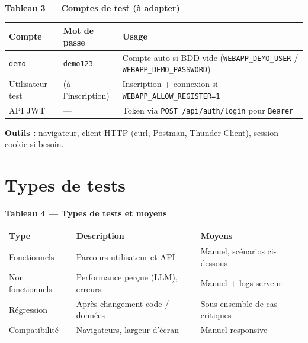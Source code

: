 \documentclass[11pt,a4paper]{article}
\begin{document}
\textbf{Tableau 3 — Comptes de test (à adapter)}

\small
\begin{longtable}{@{}p{2.2cm}p{2.2cm}p{9cm}@{}}
\toprule
\textbf{Compte} & \textbf{Mot de passe} & \textbf{Usage} \\
\midrule
\texttt{demo} & \texttt{demo123} & Compte auto si BDD vide (\texttt{WEBAPP\_DEMO\_USER} / \texttt{WEBAPP\_DEMO\_PASSWORD}) \\
Utilisateur test & (à l'inscription) & Inscription + connexion si \texttt{WEBAPP\_ALLOW\_REGISTER=1} \\
API JWT & — & Token via \texttt{POST /api/auth/login} pour \texttt{Bearer} \\
\bottomrule
\end{longtable}
\normalsize

\noindent\textbf{Outils :} navigateur, client HTTP (curl, Postman, Thunder Client), session cookie si besoin.

\section{Types de tests}
\textbf{Tableau 4 — Types de tests et moyens}

\small
\begin{longtable}{@{}p{2.4cm}p{4.4cm}p{6.4cm}@{}}
\toprule
\textbf{Type} & \textbf{Description} & \textbf{Moyens} \\
\midrule
Fonctionnels & Parcours utilisateur et API & Manuel, scénarios ci-dessous \\
Non fonctionnels & Performance perçue (LLM), erreurs & Manuel + logs serveur \\
Régression & Après changement code / données & Sous-ensemble de cas critiques \\
Compatibilité & Navigateurs, largeur d'écran & Manuel responsive \\
\bottomrule
\end{longtable}
\normalsize
\end{document}
